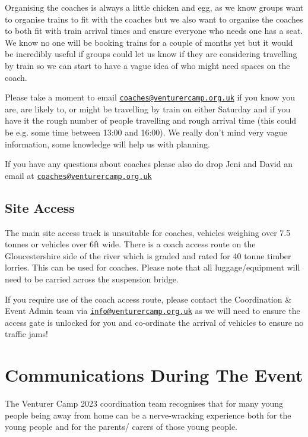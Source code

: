 \documentclass[a4paper, 11pt]{report}
\newcommand{\nl}{\newline}
\begin{document}
Organising the coaches is always a little chicken and egg, as we know groups want to organise trains to fit with the coaches but we also want to organise the coaches to both fit with train arrival times and ensure everyone who needs one has a seat. We know no one will be booking trains for a couple of months yet but it would be incredibly useful if groups could let us know if they are considering travelling by train so we can start to have a vague idea of who might need spaces on the coach. \nl

Please take a moment to email \href{mailto:coaches@venturercamp.org.uk}{\texttt{coaches@venturercamp.org.uk}} if you know you are, are likely to, or might be travelling by train on either Saturday and if you have it the rough number of people travelling and rough arrival time (this could be e.g. some time between 13:00 and 16:00). We really don't mind very vague information, some knowledge will help us with planning.

If you have any questions about coaches please also do drop Jeni and David an email at \href{mailto:coaches@venturercamp.org.uk}{\texttt{coaches@venturercamp.org.uk}}

\section{Site Access}
The main site access track is unsuitable for coaches, vehicles weighing over 7.5 tonnes or vehicles over 6ft wide. There is a coach access route on the Gloucestershire side of the river which is graded and rated for 40 tonne timber lorries. This can be used for coaches. Please note that all luggage/equipment will need to be carried across the suspension bridge.\nl

If you require use of the coach access route, please contact the Coordination \& Event Admin team via \href{mailto:info@venturercamp.org.uk}{\texttt{info@venturercamp.org.uk}} as we will need to ensure the access gate is unlocked for you and co-ordinate the arrival of vehicles to ensure no traffic jams!

\chapter{Communications During The Event}
The Venturer Camp 2023 coordination team recognises that for many young people being away from home can be a nerve-wracking experience both for the young people and for the parents/ carers of those young people.\nl
\end{document}
